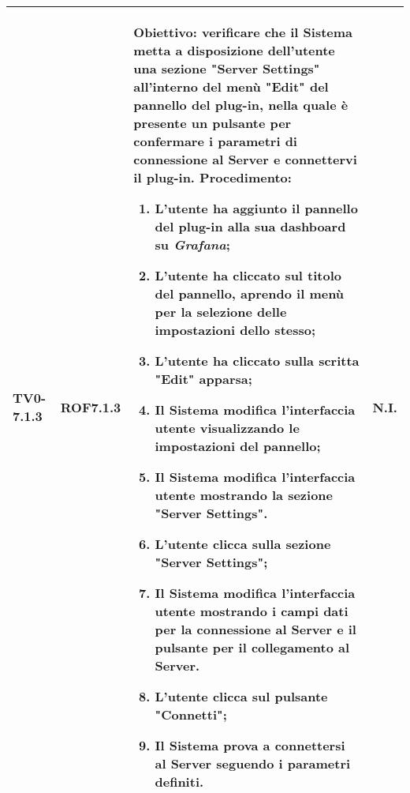 \begin{longtable}{|C{.15\textwidth}|C{.13\textwidth}|m{.65\textwidth}|C{.08\textwidth}|}
TV0-7.1.3 & ROF7.1.3 &
	\textbf{Obiettivo}: verificare che il Sistema metta a disposizione dell'utente una sezione "Server Settings" all'interno del menù "Edit" del pannello del plug-in, nella quale è presente un pulsante per confermare i parametri di connessione al Server e connettervi il plug-in. \newline
	\textbf{Procedimento}:
	\begin{enumerate}
		\item L'utente ha aggiunto il pannello del plug-in alla sua dashboard su \textit{Grafana};
		\item L'utente ha cliccato sul titolo del pannello, aprendo il menù per la selezione delle impostazioni dello stesso;
		\item L'utente ha cliccato sulla scritta "Edit" apparsa;
		\item Il Sistema modifica l'interfaccia utente visualizzando le impostazioni del pannello;
		\item Il Sistema modifica l'interfaccia utente mostrando la sezione "Server Settings".
		\item L'utente clicca sulla sezione "Server Settings";
		\item Il Sistema modifica l'interfaccia utente mostrando i campi dati per la connessione al Server e il pulsante per il collegamento al Server.
		\item L'utente clicca sul pulsante "Connetti";
		\item Il Sistema prova a connettersi al Server seguendo i parametri definiti.
	\end{enumerate}
	& N.I. \\
\hline


\end{longtable}
